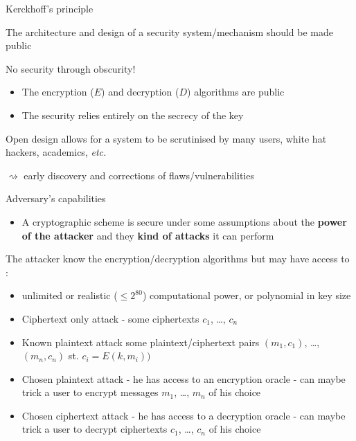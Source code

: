 \documentclass[aspectratio=169, lualatex, 10pt,dvipsnames,svgnames]{beamer} %
\newcommand{\Inblue}[1]{\textcolor{bleu}{#1}}
\def\enrouge#1{\textcolor{rouge}{#1}}
\begin{document}
\begin{frame}{Kerckhoff's principle}

  The architecture and design of a security system/mechanism should be made public
  \bigskip
  
  \begin{alertblock}{No security through obscurity!}
    \begin{itemize}
    \item The encryption ($E$) and decryption ($D$) algorithms are public
    \item The security relies entirely on the secrecy of the key
    \end{itemize}
  \end{alertblock}
  \bigskip

  Open design allows for a system to be scrutinised by many users, white hat hackers, academics, \emph{etc.}

  \enrouge{$\rightsquigarrow$} early discovery and corrections of flaws/vulnerabilities  
\end{frame}

\begin{frame}{Adversary's capabilities}
  \vspace{-0.5cm}
  \begin{alertblock}{}
    \begin{itemize}
    \item[$\bullet$] A cryptographic scheme is secure under some assumptions about the \textbf{power of the attacker} and they \textbf{kind of attacks} it can perform
    \end{itemize}
  \end{alertblock}
  \medskip
  \pause
  
  The attacker know the encryption/decryption algorithms but may have access to :
  \begin{itemize}
  \item unlimited or realistic ($\le 2^{80}$) \Inblue{computational power}, or polynomial in key size \medskip
    \pause
  \item \Inblue{Ciphertext only attack} - some ciphertexts $c_1$, \ldots, $c_n$
    \medskip
    \pause
    
  \item \Inblue{Known plaintext attack} some plaintext/ciphertext pairs $(m_1, c_1)$, \ldots, $(m_n, c_n)$ st. $c_i = E(k, m_i))$
    \medskip
    \pause

  \item \Inblue{Chosen plaintext attack} - he has access to an encryption oracle - can maybe trick a user to encrypt messages $m_1$, \dots, $m_n$ of his choice
    \medskip
    \pause

  \item \Inblue{Chosen ciphertext attack} - he has access to a decryption oracle - can maybe trick a user to decrypt ciphertexts $c_1$, \dots, $c_n$ of his choice
    \medskip


  \end{itemize}

\end{frame}
\end{document}
